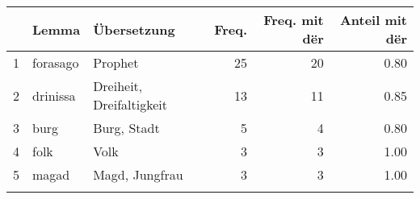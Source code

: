 \begin{tabular}{rllrrr}
  \lsptoprule
 & Lemma & Übersetzung & Freq. & Freq. mit dër & Anteil mit dër \\ 
  \midrule
1 & forasago & Prophet &  25 &  20 & 0.80 \\ 
  2 & drinissa & Dreiheit, Dreifaltigkeit &  13 &  11 & 0.85 \\ 
  3 & burg & Burg, Stadt &   5 &   4 & 0.80 \\ 
  4 & folk & Volk &   3 &   3 & 1.00 \\ 
  5 & magad & Magd, Jungfrau &   3 &   3 & 1.00 \\ 
   \lspbottomrule
\end{tabular}

